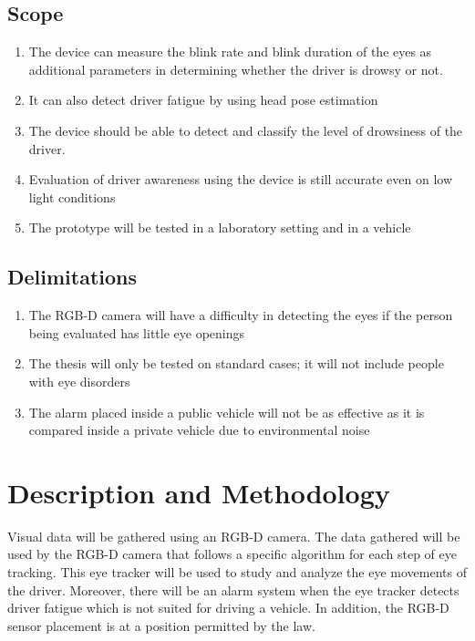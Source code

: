 \subsection{Scope}
\begin{enumerate}
	
	\item The device can measure the blink rate and blink duration of the eyes as additional parameters in determining whether the driver is drowsy or not.
	
	\item It can also detect driver fatigue by using head pose estimation
	
	\item The device should be able to detect and classify the level of drowsiness of the driver.
	
	
	\item Evaluation of driver awareness using the device is still accurate even on low light conditions
	
	\item The prototype will be tested in a laboratory setting and in a vehicle
	
\end{enumerate}

\subsection{Delimitations}
\begin{enumerate}
	
	\item The RGB-D camera will have a difficulty in detecting the eyes if the person being evaluated has little eye openings 
	
	\item The thesis will only be tested on standard cases; it will not include people with eye disorders
	
	\item The alarm placed inside a public vehicle will not be as effective as it is compared inside a private vehicle due to environmental noise
	
\end{enumerate}

\section{Description and Methodology}

Visual data will be gathered using an RGB-D camera. The data gathered will be used by the RGB-D camera that follows a specific algorithm for each step of eye tracking. This eye tracker will be used to study and analyze the eye movements of the driver. Moreover, there will be an alarm system when the eye tracker detects driver fatigue which is not suited for driving a vehicle. In addition, the RGB-D sensor placement is at a position permitted by the law.

